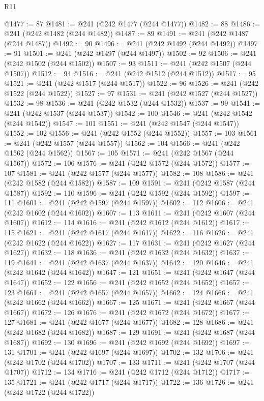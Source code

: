 \begin{lexlean}{R11}
\begin{coremodule}
@1477 := 87
@1481 := @241 (@242 @1477 (@244 @1477))
@1482 := 88
@1486 := @241 (@242 @1482 (@244 @1482))
@1487 := 89
@1491 := @241 (@242 @1487 (@244 @1487))
@1492 := 90
@1496 := @241 (@242 @1492 (@244 @1492))
@1497 := 91
@1501 := @241 (@242 @1497 (@244 @1497))
@1502 := 92
@1506 := @241 (@242 @1502 (@244 @1502))
@1507 := 93
@1511 := @241 (@242 @1507 (@244 @1507))
@1512 := 94
@1516 := @241 (@242 @1512 (@244 @1512))
@1517 := 95
@1521 := @241 (@242 @1517 (@244 @1517))
@1522 := 96
@1526 := @241 (@242 @1522 (@244 @1522))
@1527 := 97
@1531 := @241 (@242 @1527 (@244 @1527))
@1532 := 98
@1536 := @241 (@242 @1532 (@244 @1532))
@1537 := 99
@1541 := @241 (@242 @1537 (@244 @1537))
@1542 := 100
@1546 := @241 (@242 @1542 (@244 @1542))
@1547 := 101
@1551 := @241 (@242 @1547 (@244 @1547))
@1552 := 102
@1556 := @241 (@242 @1552 (@244 @1552))
@1557 := 103
@1561 := @241 (@242 @1557 (@244 @1557))
@1562 := 104
@1566 := @241 (@242 @1562 (@244 @1562))
@1567 := 105
@1571 := @241 (@242 @1567 (@244 @1567))
@1572 := 106
@1576 := @241 (@242 @1572 (@244 @1572))
@1577 := 107
@1581 := @241 (@242 @1577 (@244 @1577))
@1582 := 108
@1586 := @241 (@242 @1582 (@244 @1582))
@1587 := 109
@1591 := @241 (@242 @1587 (@244 @1587))
@1592 := 110
@1596 := @241 (@242 @1592 (@244 @1592))
@1597 := 111
@1601 := @241 (@242 @1597 (@244 @1597))
@1602 := 112
@1606 := @241 (@242 @1602 (@244 @1602))
@1607 := 113
@1611 := @241 (@242 @1607 (@244 @1607))
@1612 := 114
@1616 := @241 (@242 @1612 (@244 @1612))
@1617 := 115
@1621 := @241 (@242 @1617 (@244 @1617))
@1622 := 116
@1626 := @241 (@242 @1622 (@244 @1622))
@1627 := 117
@1631 := @241 (@242 @1627 (@244 @1627))
@1632 := 118
@1636 := @241 (@242 @1632 (@244 @1632))
@1637 := 119
@1641 := @241 (@242 @1637 (@244 @1637))
@1642 := 120
@1646 := @241 (@242 @1642 (@244 @1642))
@1647 := 121
@1651 := @241 (@242 @1647 (@244 @1647))
@1652 := 122
@1656 := @241 (@242 @1652 (@244 @1652))
@1657 := 123
@1661 := @241 (@242 @1657 (@244 @1657))
@1662 := 124
@1666 := @241 (@242 @1662 (@244 @1662))
@1667 := 125
@1671 := @241 (@242 @1667 (@244 @1667))
@1672 := 126
@1676 := @241 (@242 @1672 (@244 @1672))
@1677 := 127
@1681 := @241 (@242 @1677 (@244 @1677))
@1682 := 128
@1686 := @241 (@242 @1682 (@244 @1682))
@1687 := 129
@1691 := @241 (@242 @1687 (@244 @1687))
@1692 := 130
@1696 := @241 (@242 @1692 (@244 @1692))
@1697 := 131
@1701 := @241 (@242 @1697 (@244 @1697))
@1702 := 132
@1706 := @241 (@242 @1702 (@244 @1702))
@1707 := 133
@1711 := @241 (@242 @1707 (@244 @1707))
@1712 := 134
@1716 := @241 (@242 @1712 (@244 @1712))
@1717 := 135
@1721 := @241 (@242 @1717 (@244 @1717))
@1722 := 136
@1726 := @241 (@242 @1722 (@244 @1722))

\end{coremodule}
\end{lexlean}
